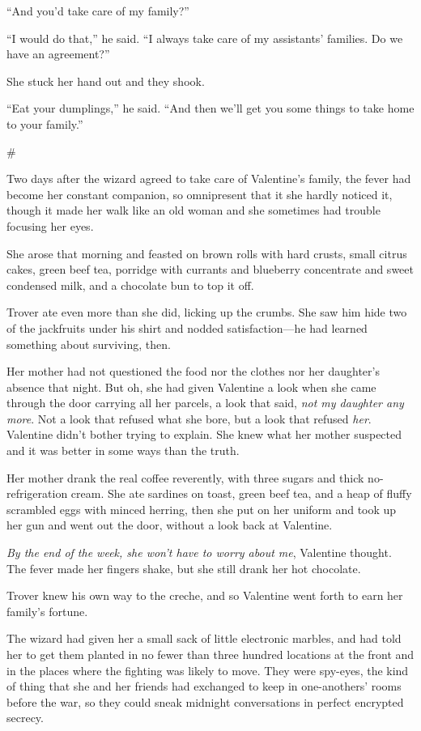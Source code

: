 “And you’d take care of my family?”

“I would do that,” he said. “I always take care of my assistants’
families. Do we have an agreement?”

She stuck her hand out and they shook.

“Eat your dumplings,” he said. “And then we’ll get you some things
to take home to your family.”

\#

Two days after the wizard agreed to take care of Valentine’s
family, the fever had become her constant companion, so omnipresent
that it she hardly noticed it, though it made her walk like an old
woman and she sometimes had trouble focusing her eyes.

She arose that morning and feasted on brown rolls with hard crusts,
small citrus cakes, green beef tea, porridge with currants and
blueberry concentrate and sweet condensed milk, and a chocolate bun
to top it off.

Trover ate even more than she did, licking up the crumbs. She saw
him hide two of the jackfruits under his shirt and nodded
satisfaction—he had learned something about surviving, then.

Her mother had not questioned the food nor the clothes nor her
daughter’s absence that night. But oh, she had given Valentine a
look when she came through the door carrying all her parcels, a
look that said, \emph{not my daughter any more}. Not a look that
refused what she bore, but a look that refused \emph{her}.
Valentine didn’t bother trying to explain. She knew what her mother
suspected and it was better in some ways than the truth.

Her mother drank the real coffee reverently, with three sugars and
thick no-refrigeration cream. She ate sardines on toast, green beef
tea, and a heap of fluffy scrambled eggs with minced herring, then
she put on her uniform and took up her gun and went out the door,
without a look back at Valentine.

\emph{By the end of the week, she won’t have to worry about me},
Valentine thought. The fever made her fingers shake, but she still
drank her hot chocolate.

Trover knew his own way to the creche, and so Valentine went forth
to earn her family’s fortune.

The wizard had given her a small sack of little electronic marbles,
and had told her to get them planted in no fewer than three hundred
locations at the front and in the places where the fighting was
likely to move. They were spy-eyes, the kind of thing that she and
her friends had exchanged to keep in one-anothers’ rooms before the
war, so they could sneak midnight conversations in perfect
encrypted secrecy.


